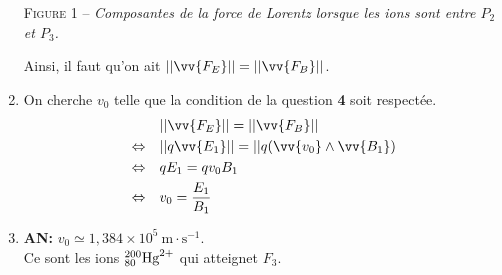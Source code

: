 \documentclass[17pt]{article}
\def\ssi{\Leftrightarrow}
\begin{document}
\begin{enumerate}[start=4]
\begin{center}
			\textsc{Figure 1 – } \textit{Composantes de la force de Lorentz lorsque les ions sont entre $P_2$ et $P_3$.}
		\end{center}
		Ainsi, il faut qu'on ait $||\vv{F_E}||=||\vv{F_B}||$.
		\item On cherche $v_0$ telle que la condition de la question \textbf{4} soit respectée. 
			\begin{align*}
				     &||\vv{F_E}||=||\vv{F_B}||\\
				\ssi\quad &||q\vv{E_1}||=||q(\vv{v_0}\wedge\vv{B_1})\\
				\ssi\quad &qE_1=qv_0B_1\\
				\ssi\quad &v_0=\frac{E_1}{B_1}
			\end{align*}
		\item \textbf{AN:} $v_0\simeq 1,384\times10^5\ \text{m}\cdot\text{s}^{-1}$.\\
		Ce sont les ions $\hbox{}^{200}_{80}\text{Hg}^{2+}$ qui atteignet $F_3$.
	\end{enumerate}
\end{document}
